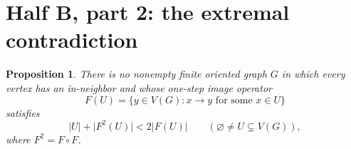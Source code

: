 \documentclass[11pt]{article}
\newtheorem{proposition}[theorem]{Proposition}
\theoremstyle{remark}
\newcommand{\abs}[1]{\lvert #1\rvert}
\begin{document}
\section{Half B, part 2: the extremal contradiction}\label{sec:incompatibility}

\begin{proposition}\label{prop:no-concavity}
There is no nonempty finite oriented graph $G$ in which every vertex has an
in-neighbor and whose one-step image operator
\[
 F(U)=\{y\in V(G):x\to y\text{ for some }x\in U\}
\]
satisfies
\begin{equation}\label{eq:impossible-concavity}
 \abs{U}+\abs{F^2(U)}<2\abs{F(U)}
 \qquad(\varnothing\ne U\subsetneq V(G)),
\end{equation}
where $F^2=F\circ F$.
\end{proposition}
\end{document}
